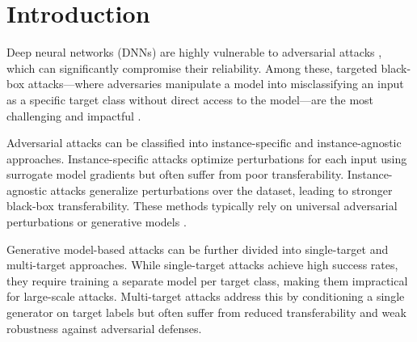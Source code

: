 \section{Introduction}
\label{sec:intro}

Deep neural networks (DNNs) are highly vulnerable to adversarial attacks \cite{szegedy2013intriguing, goodfellow2014explaining, carlini2017towards, gao2024adversarial}, which can significantly compromise their reliability. Among these, targeted black-box attacks—where adversaries manipulate a model into misclassifying an input as a specific target class without direct access to the model—are the most challenging and impactful \cite{andriushchenko2020square, athalye2018synthesizing, luo2021generating}.

Adversarial attacks can be classified into instance-specific and instance-agnostic approaches. Instance-specific attacks \cite{dong2018boosting, xiong2022stochastic, eykholt2018robust} optimize perturbations for each input using surrogate model gradients but often suffer from poor transferability. Instance-agnostic attacks \cite{xiao2018generating, naseer2019cross, yang2022boosting, fang2025clip} generalize perturbations over the dataset, leading to stronger black-box transferability. These methods typically rely on universal adversarial perturbations \cite{moosavi2017universal, zhang2020understanding} or generative models \cite{poursaeed2018generative, naseer2021generating}.

Generative model-based attacks can be further divided into single-target \cite{naseer2019cross, feng2023dynamic, wang2023towards} and multi-target \cite{yang2022boosting, fang2025clip} approaches. While single-target attacks achieve high success rates, they require training a separate model per target class, making them impractical for large-scale attacks. Multi-target attacks address this by conditioning a single generator on target labels but often suffer from reduced transferability and weak robustness against adversarial defenses.

